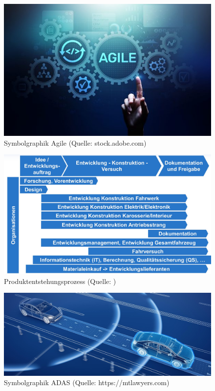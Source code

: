 \begin{figure}[htb]
	\centering
	\includegraphics[width=\textwidth]{img/agile_symbol.jpg}
	\caption[Symbolgraphik Agile (Quelle: stock.adobe.com)]{Symbolgraphik Agile (Quelle: stock.adobe.com)}
	\label{fig:agile1}
\end{figure}

\begin{figure}[htb]
	\centering
	\includegraphics[width=\textwidth]{img/PEP.jpg}
	\caption[Produktentstehungsprozess (Quelle: \cite{Daberkow2022})]{Produktentstehungsprozess (Quelle: \cite{Daberkow2022})}
	\label{fig:PEP}
\end{figure}

\begin{figure}[htb]
	\centering
	\includegraphics[width=\textwidth]{img/ADAS.jpg}
	\caption[Symbolgraphik ADAS (Quelle: https://mtlawyers.com)]{Symbolgraphik ADAS (Quelle: https://mtlawyers.com)}
	\label{fig:ADAS}
\end{figure}

